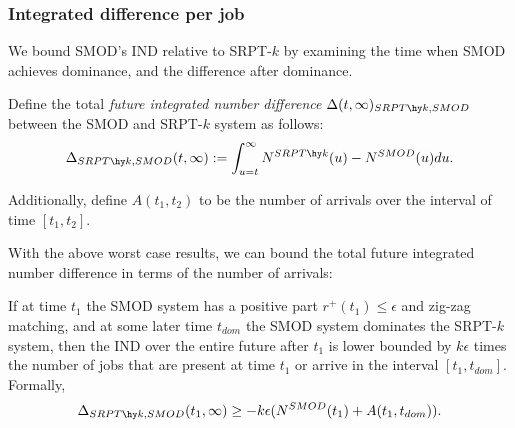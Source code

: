 \documentclass[acmsmall]{acmart}
\begin{document}
\subsubsection{Integrated difference per job}
\label{sec:diff-per-job}

We bound SMOD's IND relative to SRPT-$k$ by examining the time when SMOD achieves dominance, and the difference after dominance.

\begin{definition}\label{def:future-IND}
    Define the total \textit{future integrated number difference} $\Delta(t, \infty)_{SRPT\hy k, SMOD}$ between the SMOD and SRPT-$k$ system as follows:
    \begin{align*}
        \Delta_{SRPT\hy k, SMOD}(t, \infty) := \int_{u=t}^\infty N^{SRPT\hy k}(u) - N^{SMOD}(u) du.
    \end{align*}

    Additionally, define $A(t_1, t_2)$ to be the number of arrivals over the interval of time $[t_1, t_2]$.
\end{definition}


With the above worst case results, we can bound the total future integrated number difference in terms of the number of arrivals:

\begin{lemma}
    \label{lem:diff-per-job}
    If at time $t_1$ the SMOD system has a positive part $r^+(t_1) \le \epsilon$ and zig-zag matching,
    and at some later time $t_{dom}$ the SMOD system dominates the SRPT-$k$ system,
    then the IND over the entire future after $t_1$ is lower bounded 
    by $k \epsilon$ times the number of jobs that are present at time $t_1$ or arrive in the interval $[t_1, t_{dom}]$. Formally,
    \begin{align*}
        \Delta_{SRPT\hy k, SMOD}(t_1, \infty) \ge - k \epsilon (N^{SMOD}(t_1) + A(t_1, t_{dom})).
    \end{align*}
\end{lemma}
\end{document}
